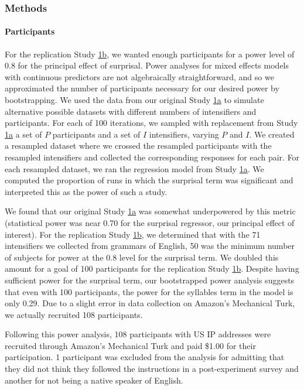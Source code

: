 \documentclass[10pt,letterpaper]{article}
\begin{document}
\subsubsection{Methods}

\paragraph{Participants}

For the replication Study \hyperref[sec:study1b]{1b}, we wanted enough participants for a power level of 0.8 for the principal effect of surprisal.
Power analyses for mixed effects models with continuous predictors are not algebraically straightforward, and so we approximated the number of participants necessary for our desired power by bootstrapping.
We used the data from our original Study \hyperref[sec:study1a]{1a} to simulate alternative possible datasets with different numbers of intensifiers and participants.
For each of 100 iterations, we sampled with replacement from Study \hyperref[sec:study1a]{1a} a set of $P$ participants and a set of $I$ intensifiers, varying $P$ and $I$.
We created a resampled dataset where we crossed the resampled participants with the resampled intensifiers and collected the corresponding responses for each pair.
For each resampled dataset, we ran the regression model from Study \hyperref[sec:study1a]{1a}.
We computed the proportion of runs in which the surprisal term was significant and interpreted this as the power of such a study.

We found that our original Study \hyperref[sec:study1a]{1a} was somewhat underpowered by this metric (statistical power was near 0.70 for the surprisal regressor, our principal effect of interest).
For the replication Study \hyperref[sec:study1b]{1b}, we determined that with the 71 intensifiers we collected from grammars of English, 50 was the minimum number of subjects for power at the 0.8 level for the surprisal term.
We doubled this amount for a goal of 100 participants for the replication Study \hyperref[sec:study1b]{1b}.
Despite having sufficient power for the surprisal term, our bootstrapped power analysis suggests that even with 100 participants, the power for the syllables term in the model is only 0.29.
Due to a slight error in data collection on Amazon's Mechanical Turk, we actually recruited 108 participants.

Following this power analysis, 108 participants with US IP addresses were recruited through Amazon’s Mechanical Turk and paid \$1.00 for their participation. 1 participant was excluded from the analysis for admitting that they did not think they followed the instructions in a post-experiment survey and another for not being a native speaker of English.
\end{document}

